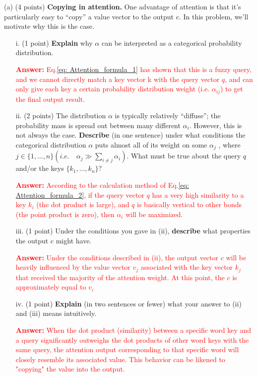 \documentclass[letterpaper,12pt]{article}
\begin{document}
	\noindent(a) (4 points) \textbf{Copying in attention.} One advantage of attention is that it’s particularly easy to “copy” a value vector to the output c. In this problem, we’ll motivate why this is the case.
		
	\begin{itemize}
	\item [i.]
	(1 point) \textbf{Explain} why $\alpha$ can be interpreted as a categorical probability distribution.
			
	\textcolor{red}{\textbf{Answer:} Eq.\ref{eq: Attention_formula_1} has shown that this is a fuzzy query, and we cannot directly match a key vector k with the query vector $q$, and can only give each key a certain probability distribution weight (i.e. $\alpha_{ij}$) to get the final output result.}

	\item [ii.]
	(2 points) The distribution $\alpha$ is typically relatively “diffuse”; the probability mass is spread out between many different $\alpha_i$. However, this is not always the case. \textbf{Describe} (in one sentence) under what conditions the categorical distribution $\alpha$ puts almost all of its weight on some $\alpha_j$ , where $j \in \{1, \ldots , n\} (i.e. \quad \alpha_j \gg \sum_{i\neq j} \alpha_i)$. What must be true about the query $q$ and/or the keys $\{k_1, \ldots , k_n\}$?
			
	\textcolor{red}{\textbf{Answer:} According to the calculation method of Eq.\ref{eq: Attention_formula_2}, if the query vector $q$ has a very high similarity to a key $k_i$ (the dot product is large), and $q$ is basically vertical to other bonds (the point product is zero), then $\alpha_i$ will be maximized.}

	\item [iii.]
	(1 point) Under the conditions you gave in (ii), \textbf{describe} what properties the output c might have.
			
	\textcolor{red}{\textbf{Answer:} Under the conditions described in (ii), the output vector $c$ will be heavily influenced by the value vector $v_j$ associated with the key vector $k_j$ that received the majority of the attention weight. At this point, the $c$ is approximately equal to $v_i$}

    \item [iv.]
	(1 point) \textbf{Explain} (in two sentences or fewer) what your answer to (ii) and (iii) means intuitively.
			
	\textcolor{red}{\textbf{Answer:} When the dot product (similarity) between a specific word key and a query significantly outweighs the dot products of other word keys with the same query, the attention output corresponding to that specific word will closely resemble its associated value. This behavior can be likened to "copying" the value into the output.}
	\end{itemize}	
		
\end{document}
